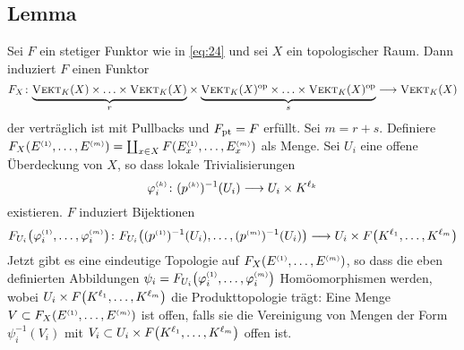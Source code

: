\subsection[Lemma: Induzierter Funktor eines stetigen Funktors]{Lemma} %
\label{sub:25}
Sei $F$ ein stetiger Funktor wie in \eqref{eq:24} und sei $X$ ein topologischer Raum. Dann induziert $F$ einen Funktor
\[
	F_X \colon {\underbrace{\textsc{Vekt}_K(X) \times \ldots \times \textsc{Vekt}_K(X)}_{r}} \times {\underbrace{\textsc{Vekt}_K(X)^{\mathrm{op}}\times \ldots \times \textsc{Vekt}_K(X)^{\mathrm{op}}}_{s}} \longrightarrow \textsc{Vekt}_K(X)
\]
der verträglich ist mit Pullbacks und $F_{\mathrm{pt}}=F$ erfüllt. 
Sei $m=r+s$. Definiere 
\(
	F_X \enbrace*{E^\ssbrace{1}, \ldots , E^\ssbrace{m}} = \coprod_{x \in X} F \enbrace*{E_x^\ssbrace{1}, \ldots , E_x^\ssbrace{m}}   
\)
als Menge. Sei $U_i$ eine offene Überdeckung von $X$, so dass lokale Trivialisierungen 
\[
	\varphi_i^{\scriptscriptstyle(k)} \colon (p^{\scriptscriptstyle(k)})^{-1}(U_i) \longrightarrow U_i \times K^{\ell_k}
\]
existieren. $F$ induziert Bijektionen
\[
	F_{U_i} \enbrace*{\varphi_i^\ssbrace{1}, \ldots , \varphi_i^\ssbrace{m}} \colon F_{U_i} \enbrace*{(p^\ssbrace{1})^{-1}(U_i), \ldots , (p^\ssbrace{m})^{-1}(U_i)}
	\longrightarrow U_i \times F \enbrace*{K^{\ell_1}, \ldots , K^{\ell_m}}   
\]
Jetzt gibt es eine eindeutige Topologie auf $F_X \enbrace*{E^\ssbrace{1}, \ldots , E^\ssbrace{m}}$, so dass die eben definierten Abbildungen 
$\psi_i = F_{U_i} \enbrace*{\varphi_i^\ssbrace{1}, \ldots , \varphi_i^\ssbrace{m}}$ Homöomorphismen werden, wobei $U_i \times F \enbrace*{K^{\ell_1}, \ldots , K^{\ell_m}}$ 
die Produkttopologie trägt: Eine Menge $V \subset F_X \enbrace*{E^\ssbrace{1}, \ldots , E^\ssbrace{m}}$ ist offen, falls sie die Vereinigung von Mengen der Form 
$\psi_i^{-1}(V_i)$ mit $V_i \subset U_i \times F \enbrace*{K^{\ell_1}, \ldots , K^{\ell_m}}$ offen ist.

